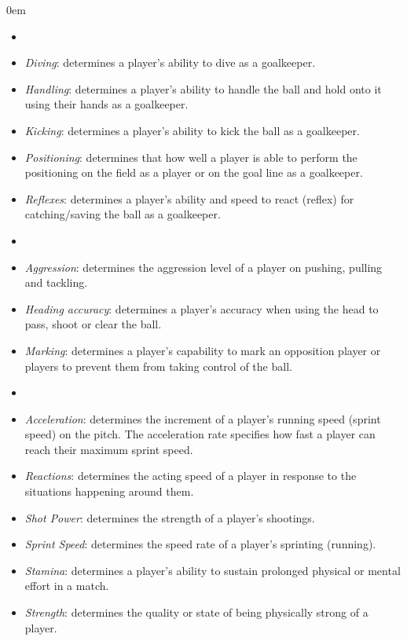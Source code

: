 \renewcommand{\labelitemi}{}
\begin{description}
    \itemsep0em
    \item[Goalkeeper:]
    \begin{itemize}
        \itemsep0.3em
        \item[]
        \item{\textit{Diving}:} determines a player's ability to dive as a goalkeeper.
        \item{\textit{Handling}:} determines a player's ability to handle the ball and hold onto it using their hands as a goalkeeper.
        \item{\textit{Kicking}:} determines a player's ability to kick the ball as a goalkeeper.
        \item{\textit{Positioning}:} determines that how well a player is able to perform the positioning on the field as a player or on the goal line as a goalkeeper.
        \item{\textit{Reflexes}:} determines a player's ability and speed to react (reflex) for catching/saving the ball as a goalkeeper.
    \end{itemize}
    \item[Mental:]
    \begin{itemize}
        \itemsep0.3em
        \item[]
        \item{\textit{Aggression}:} determines the aggression level of a player on pushing, pulling and tackling.
        \item{\textit{Heading accuracy}:} determines a player's accuracy when using the head to pass, shoot or clear the ball.
        \item{\textit{Marking}:} determines a player's capability to mark an opposition player or players to prevent them from taking control of the ball.
    \end{itemize}
    \item[Physical:]
    \begin{itemize}
        \itemsep0.3em
        \item[]
        \item{\textit{Acceleration}:} determines the increment of a player's running speed (sprint speed) on the pitch. The acceleration rate specifies how fast a player can reach their maximum sprint speed.
        \item{\textit{Reactions}:} determines the acting speed of a player in response to the situations happening around them.
        \item{\textit{Shot Power}:} determines the strength of a player's shootings.
        \item{\textit{Sprint Speed}:} determines the speed rate of a player's sprinting (running).
        \item{\textit{Stamina}:} determines a player's ability to sustain prolonged physical or mental effort in a match.
        \item{\textit{Strength}:} determines the quality or state of being physically strong of a player.


\end{itemize}
\end{description}
